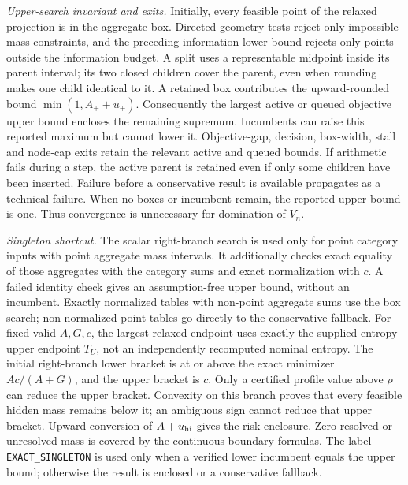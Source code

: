 \emph{Upper-search invariant and exits.} Initially, every feasible point of the relaxed projection is in the aggregate box. Directed geometry tests reject only impossible mass constraints, and the preceding information lower bound rejects only points outside the information budget. A split uses a representable midpoint inside its parent interval; its two closed children cover the parent, even when rounding makes one child identical to it. A retained box contributes the upward-rounded bound $\min(1,A_++u_+)$. Consequently the largest active or queued objective upper bound encloses the remaining supremum. Incumbents can raise this reported maximum but cannot lower it. Objective-gap, decision, box-width, stall and node-cap exits retain the relevant active and queued bounds. If arithmetic fails during a step, the active parent is retained even if only some children have been inserted. Failure before a conservative result is available propagates as a technical failure. When no boxes or incumbent remain, the reported upper bound is one. Thus convergence is unnecessary for domination of $V_n$.

\emph{Singleton shortcut.} The scalar right-branch search is used only for point category inputs with point aggregate mass intervals. It additionally checks exact equality of those aggregates with the category sums and exact normalization with $c$. A failed identity check gives an assumption-free upper bound, without an incumbent. Exactly normalized tables with non-point aggregate sums use the box search; non-normalized point tables go directly to the conservative fallback. For fixed valid $A,G,c$, the largest relaxed endpoint uses exactly the supplied entropy upper endpoint $T_U$, not an independently recomputed nominal entropy. The initial right-branch lower bracket is at or above the exact minimizer $Ac/(A+G)$, and the upper bracket is $c$. Only a certified profile value above $\rho$ can reduce the upper bracket. Convexity on this branch proves that every feasible hidden mass remains below it; an ambiguous sign cannot reduce that upper bracket. Upward conversion of $A+u_{\rm hi}$ gives the risk enclosure. Zero resolved or unresolved mass is covered by the continuous boundary formulas. The label \texttt{EXACT\_SINGLETON} is used only when a verified lower incumbent equals the upper bound; otherwise the result is enclosed or a conservative fallback.

